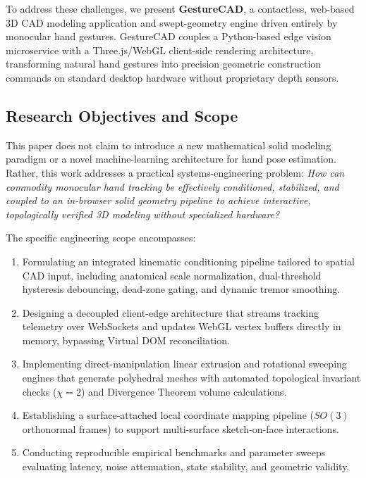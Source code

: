 To address these challenges, we present \textbf{GestureCAD}, a contactless, web-based 3D CAD modeling application and swept-geometry engine driven entirely by monocular hand gestures. GestureCAD couples a Python-based edge vision microservice with a Three.js/WebGL client-side rendering architecture, transforming natural hand gestures into precision geometric construction commands on standard desktop hardware without proprietary depth sensors.

\subsection{Research Objectives and Scope}
This paper does not claim to introduce a new mathematical solid modeling paradigm or a novel machine-learning architecture for hand pose estimation. Rather, this work addresses a practical systems-engineering problem: \textit{How can commodity monocular hand tracking be effectively conditioned, stabilized, and coupled to an in-browser solid geometry pipeline to achieve interactive, topologically verified 3D modeling without specialized hardware?}

The specific engineering scope encompasses:
\begin{enumerate}
    \item Formulating an integrated kinematic conditioning pipeline tailored to spatial CAD input, including anatomical scale normalization, dual-threshold hysteresis debouncing, dead-zone gating, and dynamic tremor smoothing.
    \item Designing a decoupled client-edge architecture that streams tracking telemetry over WebSockets and updates WebGL vertex buffers directly in memory, bypassing Virtual DOM reconciliation.
    \item Implementing direct-manipulation linear extrusion and rotational sweeping engines that generate polyhedral meshes with automated topological invariant checks ($\chi = 2$) and Divergence Theorem volume calculations.
    \item Establishing a surface-attached local coordinate mapping pipeline ($SO(3)$ orthonormal frames) to support multi-surface sketch-on-face interactions.
    \item Conducting reproducible empirical benchmarks and parameter sweeps evaluating latency, noise attenuation, state stability, and geometric validity.
\end{enumerate}

